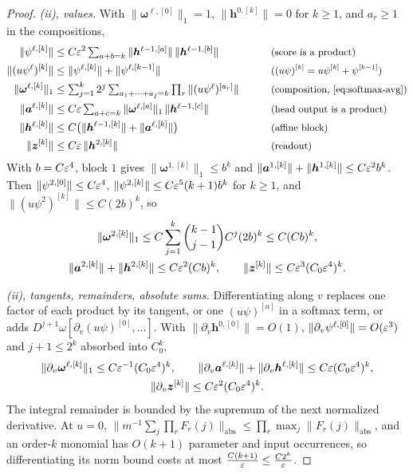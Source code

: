 \begin{proof}
\emph{(ii), values.} With $\|\bm\omega^{\ell,[0]}\|_1=1$, $\|\bm h^{0,[k]}\|=0$ for $k\ge1$, and $a_r\ge1$ in the compositions,
\begin{alignat*}{2}
 \|\psi^{\ell,[k]}\|&\le C\initscale^2\textstyle\sum_{a+b=k}\|\bm h^{\ell-1,[a]}\|\,\|\bm h^{\ell-1,[b]}\| &\qquad& \why{score is a product}\\
 \|(u\psi^\ell)^{[k]}\|&\le\|\psi^{\ell,[k]}\|+\|\psi^{\ell,[k-1]}\| && \why{$(u\psi)^{[k]}=u\psi^{[k]}+\psi^{[k-1]}$}\\
 \|\bm\omega^{\ell,[k]}\|_1&\le\textstyle\sum_{j=1}^k2^j\sum_{a_1+\cdots+a_j=k}\prod_r\|(u\psi^\ell)^{[a_r]}\| && \why{composition, \cref{eq:softmax-avg}}\\
 \|\bm a^{\ell,[k]}\|&\le C\initscale\textstyle\sum_{a+c=k}\|\bm\omega^{\ell,[a]}\|_1\,\|\bm h^{\ell-1,[c]}\| && \why{head output is a product}\\
 \|\bm h^{\ell,[k]}\|&\le C\bigl(\|\bm h^{\ell-1,[k]}\|+\|\bm a^{\ell,[k]}\|\bigr) && \why{affine block}\\
 \|\bm z^{[k]}\|&\le C\initscale\,\|\bm h^{2,[k]}\| && \why{readout}
\end{alignat*}
With $b=C\varepsilon^4$, block $1$ gives $\|\bm\omega^{1,[k]}\|_1\le b^k$ and $\|\bm a^{1,[k]}\|+\|\bm h^{1,[k]}\|\le C\varepsilon^2b^k$. Then $\|\psi^{2,[0]}\|\le C\varepsilon^4$,
$\|\psi^{2,[k]}\|\le C\varepsilon^5(k+1)b^k$ for $k\ge1$, and $\|(u\psi^2)^{[k]}\|\le C(2b)^k$, so
\begin{gather*}
 \|\bm\omega^{2,[k]}\|_1\le C\sum_{j=1}^k\binom{k-1}{j-1}C^j(2b)^k\le C(Cb)^k,\\
 \|\bm a^{2,[k]}\|+\|\bm h^{2,[k]}\|\le C\varepsilon^2(Cb)^k,\qquad \|\bm z^{[k]}\|\le C\varepsilon^3(C_0\varepsilon^4)^k .
\end{gather*}

\emph{(ii), tangents, remainders, absolute sums.} Differentiating along $v$ replaces one factor of each product by its tangent, or one
$(u\psi)^{[a]}$ in a softmax term, or adds $D^{j+1}\omega[\partial_v(u\psi)^{[0]},\ldots]$. With $\|\partial_v\bm h^{0,[0]}\|=O(1)$, $\|\partial_v\psi^{\ell,[0]}\|=O(\varepsilon^3)$
and $j+1\le2^k$ absorbed into $C_0^k$,
\begin{gather*}
 \|\partial_v\bm\omega^{\ell,[k]}\|_1\le C\varepsilon^{-1}(C_0\varepsilon^4)^k,\qquad \|\partial_v\bm a^{\ell,[k]}\|+\|\partial_v\bm h^{\ell,[k]}\|\le C\varepsilon(C_0\varepsilon^4)^k,\\
 \|\partial_v\bm z^{[k]}\|\le C\varepsilon^2(C_0\varepsilon^4)^k .
\end{gather*}
The integral remainder is bounded by the supremum of the next normalized derivative. At $u=0$,
$\|m^{-1}\sum_j\prod_rF_r(j)\|_{\mathrm{abs}}\le\prod_r\max_j\|F_r(j)\|_{\mathrm{abs}}$, and an order-$k$ monomial has $O(k+1)$ parameter and input
occurrences, so differentiating its norm bound costs at most $\frac{C(k+1)}{\varepsilon}\le \frac{C2^k}{\varepsilon}$.


\end{proof}
